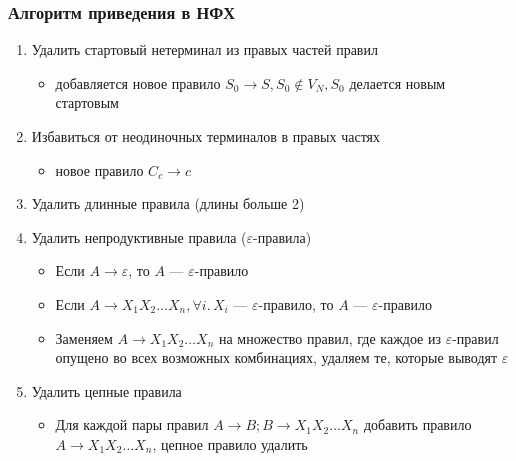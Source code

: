 \documentclass{beamer}
\begin{document}
\begin{frame}[fragile]
  \transwipe[direction=90]
  \frametitle{Алгоритм приведения в НФХ}      
  
  \begin{enumerate}
    \item Удалить стартовый нетерминал из правых частей правил 
    \begin{itemize}
      \item добавляется новое правило $S_0 \rightarrow S, S_0 \notin V_N, S_0$ делается новым стартовым
    \end{itemize}
    \item Избавиться от неодиночных терминалов в правых частях 
    \begin{itemize} 
      \item новое правило $C_c \rightarrow c$
    \end{itemize}
    \item Удалить длинные правила (длины больше 2)
    \item Удалить непродуктивные правила ($\varepsilon$-правила)
    \begin{itemize}
      \item Если $A \rightarrow \varepsilon$, то $A$ --- $\varepsilon$-правило
      \item Если $A \rightarrow X_1 X_2 \dots X_n, \forall i. \, X_i$ --- $\varepsilon$-правило, то $A$ --- $\varepsilon$-правило
      \item Заменяем $A \rightarrow X_1 X_2 \dots X_n$ на множество правил, где каждое из $\varepsilon$-правил опущено во всех возможных комбинациях, удаляем те, которые выводят $\varepsilon$
    \end{itemize}
    \item Удалить цепные правила
    \begin{itemize}
      \item Для каждой пары правил $A \rightarrow B; B \rightarrow  X_1 X_2 \dots X_n$ добавить правило $A \rightarrow  X_1 X_2 \dots X_n$, цепное правило удалить
    \end{itemize}
  \end{enumerate}
\end{frame}
\end{document}
